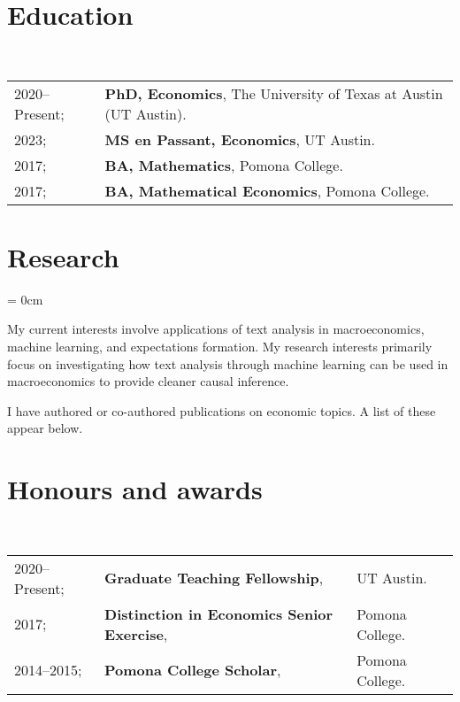 \documentclass[a4paper, 10pt]{article}
\begin{document}
  \maketitle
  \thispagestyle{firststyle}
  \section{Education}
  ~\begin{tabular}{ll}
    2020--Present; & \textbf{PhD, Economics}, The University of Texas at Austin (UT Austin).\\
    2023; & \textbf{MS en Passant, Economics}, UT Austin.\\
    2017; & \textbf{BA, Mathematics}, Pomona College.\\
    2017; & \textbf{BA, Mathematical Economics}, Pomona College.\\
  \end{tabular}
  \vspace*{0.25em}

  \section{Research}
  \begin{compactitem}\parskip = 0cm
    \item My current interests involve applications of text analysis in macroeconomics, machine learning, and expectations formation. My research interests primarily focus on investigating how text analysis through machine learning can be used in macroeconomics to provide cleaner causal inference.
    \item I have authored or co-authored  publications on economic topics. A list of these appear below.
  \end{compactitem}
  \vspace*{0.25em}

  \vspace*{-0.75em}
  \vspace*{-0.75em}
  \begin{publications}
  \end{publications}
  \vspace*{-0.75em}

  \section{Honours and awards}
  ~\begin{tabular}{lll}
    2020--Present; & \textbf{Graduate Teaching Fellowship}, & UT Austin.\\
    2017; & \textbf{Distinction in Economics Senior Exercise}, & Pomona College.\\
    2014--2015; & \textbf{Pomona College Scholar}, & Pomona College.
  \end{tabular}
  \vspace*{0.25em}
\end{document}
